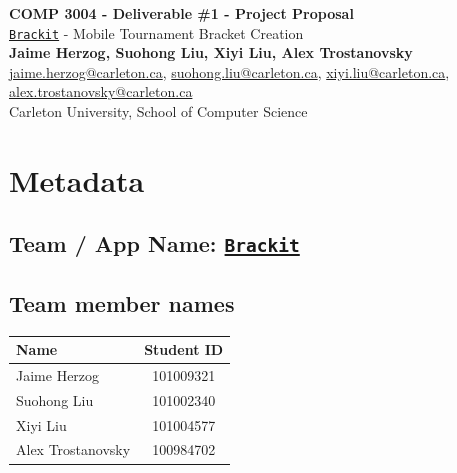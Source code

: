 \documentclass{article}
\begin{document}
\begin{center}


    \LARGE{\textbf{COMP 3004 - Deliverable \#1 - Project Proposal}} \\
    \vspace{1em}
    \Large{\href{https://github.com/alextrosta/brackit}{\texttt{Brackit}} - Mobile Tournament Bracket Creation} \\
    \vspace{1em}
    \normalsize\textbf{Jaime Herzog, Suohong Liu, Xiyi Liu, Alex Trostanovsky} \\
    \normalsize{
        \href{mailto:jaime.herzog@carleton.ca}{jaime.herzog@carleton.ca},
        \href{mailto:suohong.liu@carleton.ca}{suohong.liu@carleton.ca},
        \href{mailto:xiyi.liu@carleton.ca}{xiyi.liu@carleton.ca},
        \href{mailto:alex.trostanovsky@carleton.ca}{alex.trostanovsky@carleton.ca}
    } \\
    \vspace{1em}
    \normalsize{Carleton University, School of Computer Science} \\

\end{center}
\begin{normalsize}

\end{normalsize}

\section*{Metadata}
\subsection*{Team / App Name: \href{https://github.com/alextrosta/brackit}{\texttt{Brackit}}}
\subsection*{Team member names}
\begin{center}
    \begin{tabular}{ |l|c| }
        \hline
        \textbf{Name}     & \textbf{Student ID} \\
        \hline
        Jaime Herzog      & 101009321           \\
        Suohong Liu       & 101002340           \\
        Xiyi Liu          & 101004577           \\
        Alex Trostanovsky & 100984702           \\
        \hline
    \end{tabular}
\end{center}
\end{document}
